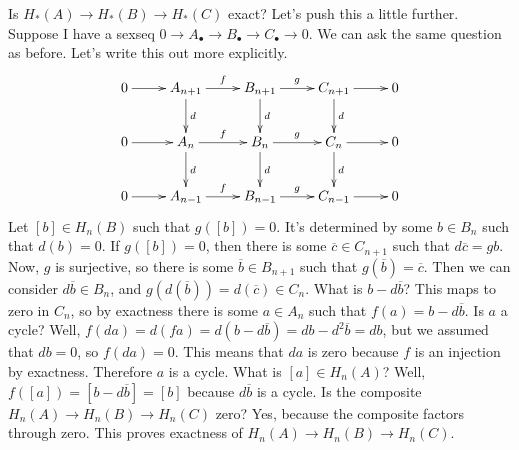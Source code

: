 \documentclass{amsart}
\theoremstyle{theorem}
\theoremstyle{definition}
\begin{document}
Is $ H_\ast(A)\to H_\ast(B)\to H_\ast(C)$ exact? Let's push this a little further. Suppose I have a sexseq $0\to A_\bullet\to B_\bullet\to C_\bullet\to 0$. We can ask the same question as before. Let's write this out more explicitly.
\begin{equation*}
\xymatrix{0\ar[r] & A_{n+1}\ar[r]^f\ar[d]^d & B_{n+1}\ar[r]^g\ar[d]^d & C_{n+1}\ar[r]\ar[d]^d & 0\\
0\ar[r] & A_n\ar[r]^f\ar[d]^d & B_n\ar[r]^g\ar[d]^d & C_n\ar[r]\ar[d]^d & 0\\
0\ar[r] & A_{n-1}\ar[r]^f & B_{n-1}\ar[r]^g & C_{n-1}\ar[r] & 0}
\end{equation*}
Let $[b]\in H_n(B)$ such that $g([b])=0$. It's determined by some $b\in B_n$ such that $d(b)=0$. If $g([b])=0$, then there is some $\overline{c}\in C_{n+1}$ such that $d\overline{c}=gb$. Now, $g$ is surjective, so there is some $\overline{b}\in B_{n+1}$ such that $g(\overline{b})=\overline{c}$. Then we can consider $d\overline{b}\in B_n$, and $g(d(\overline{b}))=d(\overline{c})\in C_n$. What is $b-d\overline{b}$? This maps to zero in $C_n$, so by exactness there is some $a\in A_n$ such that $f(a)=b-d\overline{b}$. Is $a$ a cycle? Well, $f(da)=d(fa)=d(b-d\overline{b})=db-d^2\overline{b}=db$, but we assumed that $db=0$, so $f(da)=0$. This means that $da$ is zero because $f$ is an injection by exactness. Therefore $a$ is a cycle. What is $[a]\in H_n(A)$? Well, $f([a])=[b-d\overline{b}]=[b]$ because $d\overline{b}$ is a cycle. Is the composite $ H_n(A)\to H_n(B)\to H_n(C)$ zero? Yes, because the composite factors through zero. This proves exactness of $ H_n(A)\to H_n(B)\to H_n(C)$.
\end{document}
